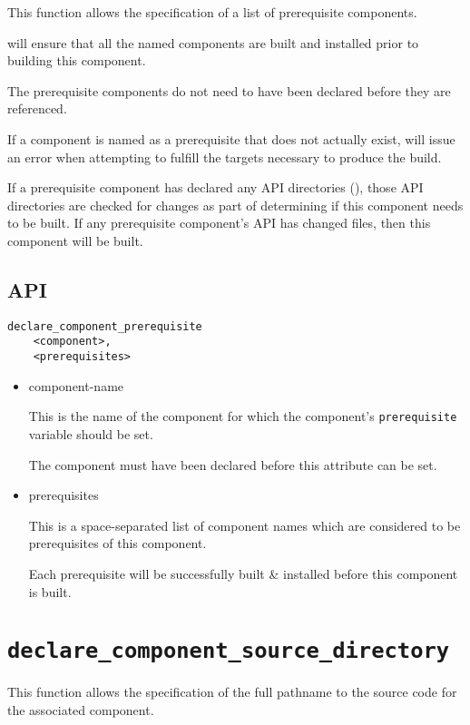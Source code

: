This function allows the specification of a list of prerequisite
components.

\lmsbw will ensure that all the named components are built and
installed prior to building this component.

The prerequisite components do not need to have been declared before
they are referenced.

If a component is named as a prerequisite that does not actually
exist, \make will issue an error when attempting to fulfill the
targets necessary to produce the build.

If a prerequisite component has declared any API directories
(), those API directories are
checked for changes as part of determining if this component needs to
be built.  If any prerequisite component's API has changed files, then
this component will be built.

\subsection{API}

\begin{verbatim}
declare_component_prerequisite
    <component>,
    <prerequisites>
\end{verbatim}

\begin{itemize}
\item component-name

  This is the name of the component for which the component's
  \texttt{prerequisite} variable should be set.

  The component must have been declared before this attribute can be
  set.

\item prerequisites

  This is a space-separated list of component names which are
  considered to be prerequisites of this component.

  Each prerequisite will be successfully built \& installed before
  this component is built.
\end{itemize}

\section{\texttt{declare\_component\_source\_directory}}\label{api:source-directory}

This function allows the specification of the full pathname to the
source code for the associated component.

